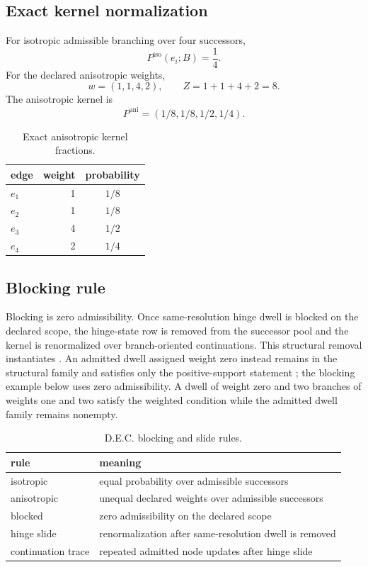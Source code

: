 \subsection{Exact kernel normalization}\label{manual:dec-ledger:kernel}
For isotropic admissible branching over four successors,
\[
P^{\mathrm{iso}}(e_i;B)=\frac14.
\]
For the declared anisotropic weights,
\[
w=(1,1,4,2),
\qquad
Z=1+1+4+2=8.
\]
The anisotropic kernel is
\[
P^{\mathrm{ani}}=(1/8,1/8,1/2,1/4).
\]
\begin{table}[H]
\centering
\scriptsize
\caption{Exact anisotropic kernel fractions.}
\begin{tabular}{l r c}
\toprule
edge & weight & probability\\
\midrule
$e_1$ & 1 & $1/8$\\
$e_2$ & 1 & $1/8$\\
$e_3$ & 4 & $1/2$\\
$e_4$ & 2 & $1/4$\\
\bottomrule
\end{tabular}
\label{tab:manual-dec-kernel-fractions}
\end{table}


\subsection{Blocking rule}\label{manual:dec-ledger:blocking-rule}
Blocking is zero admissibility. Once same-resolution hinge dwell is blocked on the declared scope, the hinge-state row is removed from the successor pool and the kernel is renormalized over branch-oriented continuations.
This structural removal instantiates .
An admitted dwell assigned weight zero instead remains in the structural
family and satisfies only the positive-support statement
; the blocking example below
uses zero admissibility.
A dwell of weight zero and two branches of weights one and two satisfy
the weighted condition while the admitted dwell family remains nonempty.
\begin{table}[H]
\centering
\scriptsize
\caption{D.E.C. blocking and slide rules.}
\begin{tabular}{l l}
\toprule
rule & meaning\\
\midrule
isotropic & equal probability over admissible successors\\
anisotropic & unequal declared weights over admissible successors\\
blocked & zero admissibility on the declared scope\\
hinge slide & renormalization after same-resolution dwell is removed\\
continuation trace & repeated admitted node updates after hinge slide\\
\bottomrule
\end{tabular}
\label{tab:manual-dec-blocking-rules}
\end{table}

